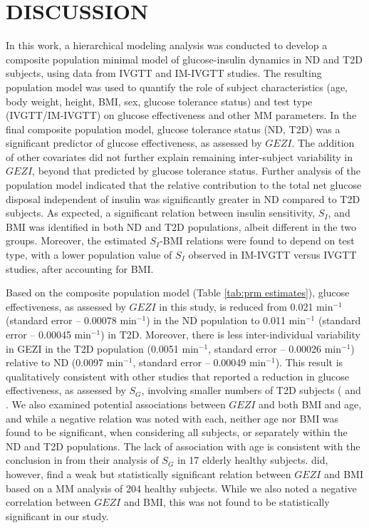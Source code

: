 \documentclass[utf8]{frontiersSCNS} %
\begin{document}
\section{DISCUSSION}
In this work, a hierarchical modeling analysis was conducted to develop a composite population minimal model of glucose-insulin dynamics in ND and T2D subjects, using data from IVGTT and IM-IVGTT studies. The resulting population model was used to quantify the role of subject characteristics (age, body weight, height, BMI, sex, glucose tolerance status) and test type (IVGTT/IM-IVGTT) on glucose effectiveness and other MM parameters. In the final composite population model, glucose tolerance status (ND, T2D) was a significant predictor of glucose effectiveness, as assessed by $GEZI$. The addition of other covariates did not further explain remaining inter-subject variability in $GEZI$, beyond that predicted by glucose tolerance status. Further analysis of the population model indicated that the relative contribution to the total net glucose disposal independent of insulin was significantly greater in ND compared to T2D subjects. As expected, a significant relation between insulin sensitivity, $S_I$, and BMI was identified in both ND and T2D populations, albeit different in the two groups. Moreover, the estimated $S_I$-BMI relations were found to depend on test type, with a lower population value of $S_I$ observed in IM-IVGTT versus IVGTT studies, after accounting for BMI. 

Based on the composite population model (Table \ref{tab:prm estimates}), glucose effectiveness, as assessed by $GEZI$ in this study, is reduced from 0.021 min$^{-1}$ (standard error – 0.00078 min$^{-1}$) in the ND population to 0.011 min$^{-1}$ (standard error – 0.00045 min$^{-1}$) in T2D. Moreover, there is less inter-individual variability in GEZI in the T2D population (0.0051 min$^{-1}$, standard error – 0.00026 min$^{-1}$) relative to ND (0.0097 min$^{-1}$, standard error – 0.00049 min$^{-1}$). This result is qualitatively consistent with other studies that reported a reduction in glucose effectiveness, as assessed by $S_G$, involving smaller numbers of T2D subjects (\citet{welch_1990} and \citet{ataru_1992}. We also examined potential associations between $GEZI$ and both BMI and age, and while a negative relation was noted with each, neither age nor BMI was found to be significant, when considering all subjects, or separately within the ND and T2D populations. The lack of association with age is consistent with the conclusion in \citet{pacini_1998} from their analysis of $S_G$ in 17 elderly healthy subjects. \citet{Morettini_2019} did, however, find a weak but statistically significant relation between $GEZI$ and BMI based on a MM analysis of 204 healthy subjects. While we also noted a negative correlation between $GEZI$ and BMI, this was not found to be statistically significant in our study.
\end{document}
